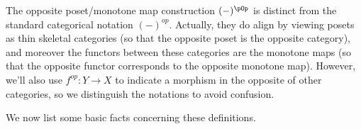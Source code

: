 \documentclass{article}
\begin{document}
\begin{note}
\label{note:tale_of_two_orders}
\item
The opposite poset/monotone map construction $(-)^{\pOp}$ is distinct from the standard categorical notation $(-)^{op}$. Actually, they do align by viewing posets as thin skeletal categories (so that the opposite poset is the opposite category), and moreover the functors between these categories are the monotone maps (so that the opposite functor corresponds to the opposite monotone map). However, we'll also use $f^{op} : Y \to X$ to indicate a morphism in the opposite of other categories, so we distinguish the notations to avoid confusion. \endbox
\end{note}


We now list some basic facts concerning these definitions.
\end{document}

